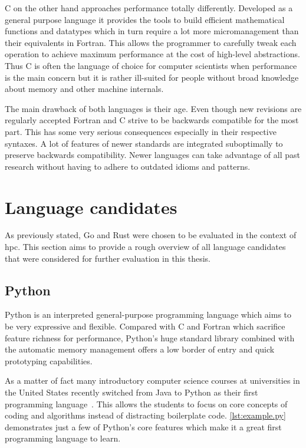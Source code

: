 C on the other hand approaches performance totally differently. Developed as a general purpose language it provides the tools to build efficient mathematical functions and datatypes which in turn require a lot more micromanagement than their equivalents in Fortran. This allows the programmer to carefully tweak each operation to achieve maximum performance at the cost of high-level abstractions. Thus C is often the language of choice for computer scientists when performance is the main concern but it is rather ill-suited for people without broad knowledge about memory and other machine internals.

The main drawback of both languages is their age. Even though new revisions are regularly accepted Fortran and C strive to be backwards compatible for the most part. This has some very serious consequences especially in their respective syntaxes. A lot of features of newer standards are integrated suboptimally to preserve backwards compatibility. Newer languages can take advantage of all past research without having to adhere to outdated idioms and patterns.

\section{Language candidates}
\label{sec:State_of_the_art::Candidates}

As previously stated, Go and Rust were chosen to be evaluated in the context of \gls{hpc}. This section aims to provide a rough overview of all language candidates that were considered for further evaluation in this thesis.

\subsection*{Python}
\label{subsec:State_of_the_art::Candidates::Python}

Python is an interpreted general-purpose programming language which aims to be very expressive and flexible. Compared with C and Fortran which sacrifice feature richness for performance, Python's huge standard library combined with the automatic memory management offers a low border of entry and quick prototyping capabilities.

As a matter of fact many introductory computer science courses at universities in the United States recently switched from Java to Python as their first programming language~\cite{GUO14, intro_py}. This allows the students to focus on core concepts of coding and algorithms instead of distracting boilerplate code. \autoref{lst:example.py} demonstrates just a few of Python's core features which make it a great first programming language to learn.
\\


